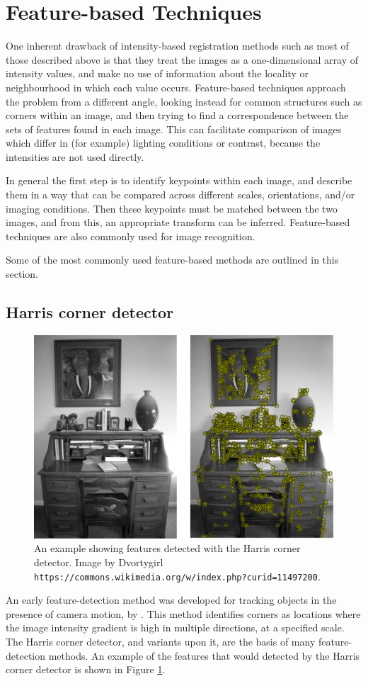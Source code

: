 \documentclass{report}
\begin{document}
\section{Feature-based Techniques}
One inherent drawback of intensity-based registration methods such as most of those described above is that they treat the images as a one-dimensional array of intensity values, and make no use of information about the locality or neighbourhood in which each value occurs. Feature-based techniques approach the problem from a different angle, looking instead for common structures such as corners within an image, and then trying to find a correspondence between the sets of features found in each image. This can facilitate comparison of images which differ in (for example) lighting conditions or contrast, because the intensities are not used directly.

In general the first step is to identify keypoints within each image, and describe them in a way that can be compared across different scales, orientations, and/or imaging conditions. Then these keypoints must be matched between the two images, and from this, an appropriate transform can be inferred. Feature-based techniques are also commonly used for image recognition.

Some of the most commonly used feature-based methods are outlined in this section.
\subsection{Harris corner detector}
\begin{figure}
\centering
\includegraphics[width = 5.5 in]{Writing_Desk_with_Harris_Detector.pdf}
\caption{An example showing features detected with the Harris corner detector. Image by  Dvortygirl \texttt{https://commons.wikimedia.org/w/index.php?curid=11497200}.}
\label{fig:harris_features}
\end{figure}
An early feature-detection method was developed for tracking objects in the presence of camera motion, by \cite{harris1988combined}. This method identifies corners as locations where the image intensity gradient is high in multiple directions, at a specified scale. The Harris corner detector, and variants upon it, are the basis of many feature-detection methods. An example of the features that would detected by the Harris corner detector is shown in Figure \ref{fig:harris_features}.
\end{document}
